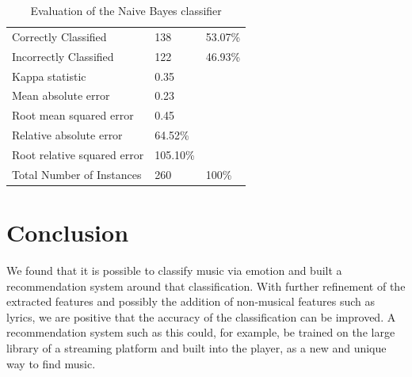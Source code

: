 \documentclass{sigchi-ext}
\begin{document}
\begin{table}
  \centering
  \begin{tabular}{@{}lll@{}}
    Correctly Classified          & 138       & 53.07\% \\
    Incorrectly Classified        & 122       & 46.93\% \\
    Kappa statistic 				      & 0.35      & \\
    Mean absolute error  			    & 0.23      & \\
    Root mean squared error 	    & 0.45      & \\
    Relative absolute error 	    & 64.52\%   & \\
    Root relative squared error   & 105.10\%  & \\
    Total Number of Instances     & 260       & 100\%
  \end{tabular}
  \caption{Evaluation of the Naive Bayes classifier}
\end{table}

\section{Conclusion}
We found that it is possible to classify music via emotion and built a recommendation system around that classification. With further refinement of the extracted features and possibly the addition of non-musical features such as lyrics, we are positive that the accuracy of the classification can be improved. A recommendation system such as this could, for example, be trained on the large library of a streaming platform and built into the player, as a new and unique way to find music.



\end{document}
